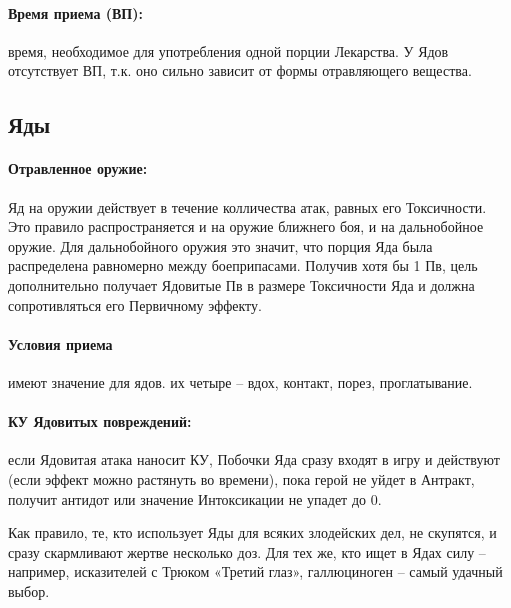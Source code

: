 \paragraph{Время приема (ВП):} время, необходимое для употребления одной порции Лекарства. У Ядов отсутствует ВП, т.к. оно сильно зависит от формы отравляющего вещества. 
\printindex[potions]

\subsection{Яды}
\paragraph{Отравленное оружие:} Яд на оружии действует в течение колличества атак, равных его Токсичности. Это правило распространяется и на оружие ближнего боя, и на дальнобойное оружие. Для дальнобойного оружия это значит, что порция Яда была распределена равномерно между боеприпасами. 
\newline Получив хотя бы 1 Пв, цель дополнительно получает Ядовитые Пв в размере Токсичности Яда и должна сопротивляться его Первичному эффекту.
\paragraph{Условия приема} имеют значение для ядов. их четыре – вдох, контакт, порез, проглатывание.
\paragraph{КУ Ядовитых повреждений:} если Ядовитая атака наносит КУ, Побочки Яда сразу входят в игру и действуют (если эффект можно растянуть во времени), пока герой не уйдет в Антракт, получит антидот или значение Интоксикации не упадет до 0.
\printindex[poisons]
\begin{tcolorbox}
    Как правило, те, кто использует Яды для всяких злодейских дел, не скупятся, и сразу скармливают жертве несколько доз.
    \newline Для тех же, кто ищет в Ядах силу – например, исказителей с Трюком «Третий глаз», галлюциноген – самый удачный выбор.
\end{tcolorbox}
